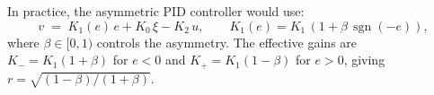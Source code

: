 \documentclass[11pt, a4paper]{article}
\theoremstyle{definition}
\theoremstyle{plain}
\theoremstyle{remark}
\begin{document}
In practice, the asymmetric PID controller would use:
\begin{equation}\label{eq:asym-pid}
  v \;=\;
    K_1(e)\,e + K_0\,\xi - K_2\,u,
  \qquad
  K_1(e) = K_1\,(1 + \beta\,\operatorname{sgn}(-e)),
\end{equation}
where $\beta \in [0, 1)$ controls the asymmetry.
The effective gains are $K_- = K_1(1+\beta)$ for $e < 0$
and $K_+ = K_1(1-\beta)$ for $e > 0$, giving
$r = \sqrt{(1-\beta)/(1+\beta)}$.

%
%
\end{document}
